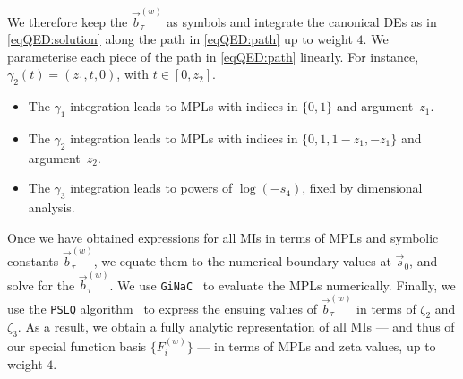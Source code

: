 \documentclass[main.tex]{subfiles}
\begin{document}
We therefore keep the $\vec{b}^{(w)}_{\tau}$ as symbols and integrate the canonical \acp{DE} as in \cref{eqQED:solution} along the path in \cref{eqQED:path} up to weight $4$. 
We parameterise each piece of the path in \cref{eqQED:path} linearly. For instance, 
$\gamma_2(t) = ( z_1,  t  , 0 )$,
with $t \in [0,z_2]$.
\begin{itemize}
\item The $\gamma_1$ integration leads to \acp{MPL} with indices in $\{0,1\}$ and argument~$z_1$.
\item The $\gamma_2$ integration leads to \acp{MPL} with indices in $\{0,1, 1-z_1, -z_1\}$ and argument~$z_2$.
\item The $\gamma_3$ integration leads to powers of $\log(-s_4)$, fixed by dimensional analysis.
\end{itemize}
Once we have obtained expressions for all \acp{MI} in terms of \acp{MPL} and symbolic constants $\vec{b}^{(w)}_{\tau}$, we equate them to the numerical boundary values at $\vec{s}_0$, and solve for the $\vec{b}^{(w)}_{\tau}$. We use \texttt{GiNaC}~\cite{Bauer:2000cp,Vollinga:2004sn} to evaluate the \acp{MPL} numerically.
Finally, we use the \texttt{PSLQ} algorithm~\cite{PSLQ} to express the ensuing values of $\vec{b}^{(w)}_{\tau}$ in terms of $\zeta_2$ and $\zeta_3$. As a result, we obtain a fully analytic representation of all \acp{MI} --- and thus of our special function basis $\{F^{(w)}_i\}$ --- in terms of \acp{MPL} and zeta values, up to weight $4$.
\end{document}
